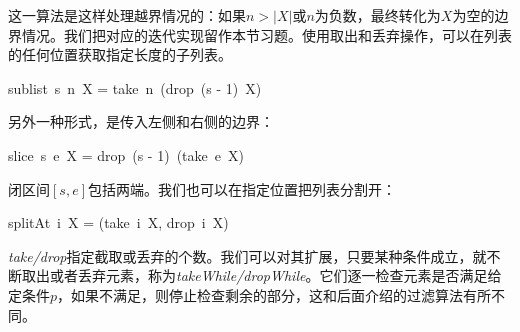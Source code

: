 \documentclass[b5paper]{ctexart}
\begin{document}
\be
{}
\ee

这一算法是这样处理越界情况的：如果$n > |X|$或$n$为负数，最终转化为$X$为空的边界情况。我们把对应的迭代实现留作本节习题。使用取出和丢弃操作，可以在列表的任何位置获取指定长度的子列表。

\be
sublist\ s\ n\ X = take\ n\ (drop\ (s - 1)\ X)
\ee

另外一种形式，是传入左侧和右侧的边界：

\be
slice\ s\ e\ X = drop\ (s - 1)\ (take\ e\ X)
\ee

闭区间$[s, e]$包括两端。我们也可以在指定位置把列表分割开：

\be
splitAt\ i\ X = (take\ i\ X, drop\ i\ X)
\label{eq:split-at}
\ee

 
\textit{take/drop}指定截取或丢弃的个数。我们可以对其扩展，只要某种条件成立，就不断取出或者丢弃元素，称为\textit{takeWhile/dropWhile}。它们逐一检查元素是否满足给定条件$p$，如果不满足，则停止检查剩余的部分，这和后面介绍的过滤算法有所不同。

\be
{}
\ee
\end{document}
